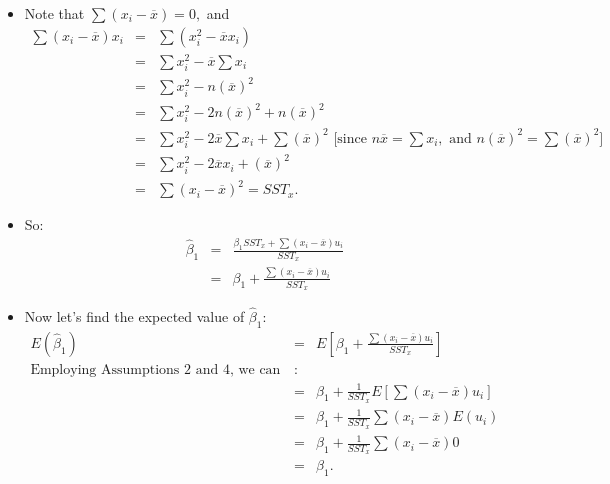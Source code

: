 \documentclass[11pt]{article}
\begin{document}
\begin{itemize}
\item Note that $\sum \left( x_{i}-\overline{x}\right) =0,$ and 
\begin{eqnarray*}
\sum \left( x_{i}-\overline{x}\right) x_{i} &=&\sum \left( x_{i}^{2}-%
\overline{x}x_{i}\right) \\
&=&\sum x_{i}^{2}-\overline{x}\sum x_{i} \\
&=&\sum x_{i}^{2}-n\left( \overline{x}\right) ^{2} \\
&=&\sum x_{i}^{2}-2n\left( \overline{x}\right) ^{2}+n\left( \overline{x}%
\right) ^{2} \\
&=&\sum x_{i}^{2}-2\overline{x}\sum x_{i}+\sum \left( \overline{x}\right)
^{2}\text{ [since }n\overline{x}=\sum x_{i},\text{ and }n\left( \overline{x}%
\right) ^{2}=\sum \left( \overline{x}\right) ^{2}\text{]} \\
&=&\sum x_{i}^{2}-2\overline{x}x_{i}+\left( \overline{x}\right) ^{2} \\
&=&\sum \left( x_{i}-\overline{x}\right) ^{2}=SST_{x}.
\end{eqnarray*}

\item So:%
\begin{eqnarray*}
\widehat{\beta }_{1} &=&\frac{\beta _{1}SST_{x}+\sum \left( x_{i}-\overline{x%
}\right) u_{i}}{SST_{x}} \\
&=&\beta _{1}+\frac{\sum \left( x_{i}-\overline{x}\right) u_{i}}{SST_{x}}
\end{eqnarray*}

\item Now let's find the expected value of $\widehat{\beta }_{1}:$%
\begin{eqnarray*}
E\left( \widehat{\beta }_{1}\right) &=&E\left[ \beta _{1}+\frac{\sum \left(
x_{i}-\overline{x}\right) u_{i}}{SST_{x}}\right] \\
\text{Employing Assumptions 2 and 4, we can proceed} &\text{:}& \\
&=&\beta _{1}+\frac{1}{SST_{x}}E\left[ \sum \left( x_{i}-\overline{x}\right)
u_{i}\right] \\
&=&\beta _{1}+\frac{1}{SST_{x}}\sum \left( x_{i}-\overline{x}\right) E\left(
u_{i}\right) \\
&=&\beta _{1}+\frac{1}{SST_{x}}\sum \left( x_{i}-\overline{x}\right) 0 \\
&=&\beta _{1}.
\end{eqnarray*}


\end{itemize}
\end{document}
